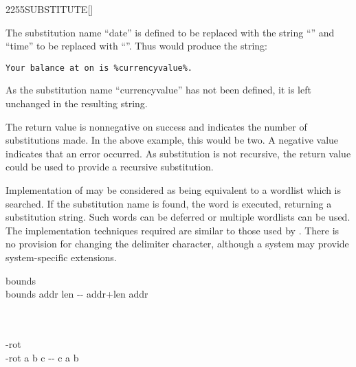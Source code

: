 \begin{worddef}{2255}{SUBSTITUTE}[]
\begin{rationale}
		The substitution name ``date'' is defined to be replaced with the string
		``\pdate'' and ``time'' to be replaced with ``\ptime''.  Thus
		 would produce the string:

		\begin{center}
			\texttt{Your balance at \ptime{} on \pdate{} is \%currencyvalue\%.}
		\end{center}

		As the substitution name ``currencyvalue'' has not been defined, it is
		left unchanged in the resulting string.

		The return value  is nonnegative on success and indicates the
		number of substitutions made.  In the above example, this would be two.
		A negative value indicates that an error occurred.
		As substitution is not recursive, the return value could be used to
		provide a recursive substitution.

		Implementation of  may be considered as being equivalent
		to a wordlist which is searched.  If the substitution name is found, the
		word is executed, returning a substitution string.
		Such words can be deferred or multiple wordlists can be used.
		The implementation techniques required are similar to those used by
		.
		There is no provision for changing the delimiter character, although a
		system may provide system-specific extensions.
	\end{rationale}

	\begin{implement} %

		\word[tools]{[UNDEFINED]} bounds \word[tools]{[IF]} \\
		\tab \word{:} bounds \tab {} addr len -{}- addr+len addr \\
		\tab[2]  \word{+} \\
		\tab \word{;} \\
		\word[tools]{[THEN]}

		\word[tools]{[UNDEFINED]} -rot \word[tools]{[IF]} \\
		\tab \word{:} -rot \tab {} a b c -{}- c a b \\
		\tab[2] \word{ROT}  \\
		\tab \word{;} \\
		\word[tools]{[THEN]}


\end{implement}
\end{worddef}
